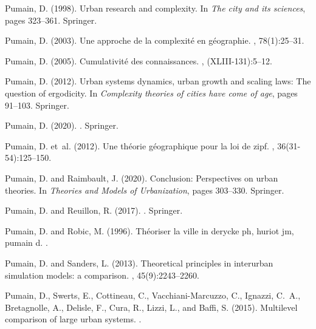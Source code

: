 \documentclass[10pt]{article}
\begin{document}
\begin{thebibliography}{}
Pumain, D. (1998).
\newblock Urban research and complexity.
\newblock In {\em The city and its sciences}, pages 323--361. Springer.

Pumain, D. (2003).
\newblock Une approche de la complexit{\'e} en g{\'e}ographie.
, 78(1):25--31.

Pumain, D. (2005).
\newblock Cumulativit{\'e} des connaissances.
, (XLIII-131):5--12.

Pumain, D. (2012).
\newblock Urban systems dynamics, urban growth and scaling laws: The question
  of ergodicity.
\newblock In {\em Complexity theories of cities have come of age}, pages
  91--103. Springer.

Pumain, D. (2020).
.
\newblock Springer.

Pumain, D. et~al. (2012).
\newblock Une th{\'e}orie g{\'e}ographique pour la loi de zipf.
, 36(31-54):125--150.

Pumain, D. and Raimbault, J. (2020).
\newblock Conclusion: Perspectives on urban theories.
\newblock In {\em Theories and Models of Urbanization}, pages 303--330.
  Springer.

Pumain, D. and Reuillon, R. (2017).
.
\newblock Springer.

Pumain, D. and Robic, M. (1996).
\newblock Th{\'e}oriser la ville in derycke ph, huriot jm, pumain d.
.

Pumain, D. and Sanders, L. (2013).
\newblock Theoretical principles in interurban simulation models: a comparison.
, 45(9):2243--2260.

Pumain, D., Swerts, E., Cottineau, C., Vacchiani-Marcuzzo, C., Ignazzi, C.~A.,
  Bretagnolle, A., Delisle, F., Cura, R., Lizzi, L., and Baffi, S. (2015).
\newblock Multilevel comparison of large urban systems.
.


\end{thebibliography}
\end{document}
